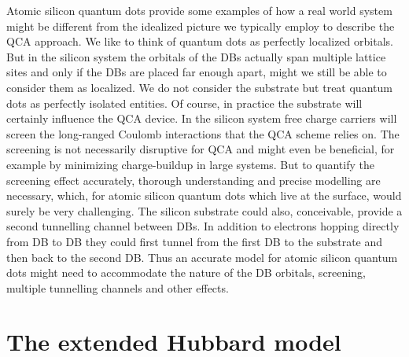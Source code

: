Atomic silicon quantum dots provide some examples of how a real world system
might be different from the idealized picture we typically employ to describe
the QCA approach. We like to think of quantum dots as perfectly localized
orbitals. But in the silicon system the orbitals of the DBs actually span
multiple lattice sites and only if the DBs are placed far enough apart, might we
still be able to consider them as localized. We do not consider the substrate
but treat quantum dots as perfectly isolated entities. Of course, in practice
the substrate will certainly influence the QCA device. In the silicon system
free charge carriers will screen the long-ranged Coulomb interactions that the
QCA scheme relies on. The screening is not necessarily disruptive for QCA and
might even be beneficial, for example by minimizing charge-buildup in large
systems. But to quantify the screening effect accurately, thorough understanding
and precise modelling are necessary, which, for atomic silicon quantum dots
which live at the surface, would surely be very challenging. The silicon
substrate could also, conceivable, provide a second tunnelling channel between
DBs. In addition to electrons hopping directly from DB to DB they could first
tunnel from the first DB to the substrate and then back to the second DB. Thus
an accurate model for atomic silicon quantum dots might need to accommodate the
nature of the DB orbitals, screening, multiple tunnelling channels and other
effects.


\section{The extended Hubbard model}

